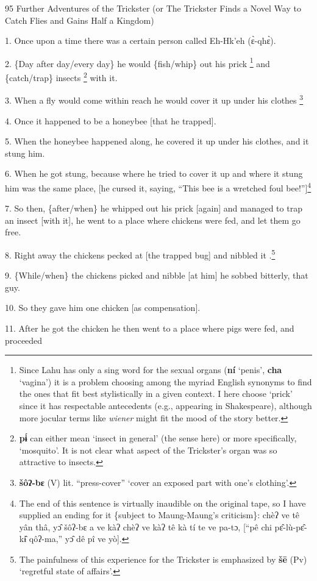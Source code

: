 
95 Further Adventures of the Trickster (or The Trickster Finds a Novel Way to Catch
Flies and Gains Half a Kingdom)

1. Once upon a time there was a certain person called Eh-Hk'eh (ɛ̀-qhɛ̀).

2. \{Day after day/every day\} he would \{fish/whip\} out his prick \footnote{Since Lahu has only a sing word for the sexual organs (\textbf{ní }`penis', \textbf{cha} `vagina') it is a problem choosing among the myriad English synonyms to find the ones that fit best stylistically in a given context. I here choose `prick' since it has respectable antecedents (e.g., appearing in Shakespeare), although more jocular terms like \textit{wiener} might fit the mood of the story better.} and \{catch/trap\}
insects \footnote{\textbf{pɨ́ }can either mean `insect in general' (the sense here) or more specifically, `mosquito'. It is not clear what aspect of the Trickster's organ was so attractive to insects.} with it.

3. When a fly would come within reach he would cover it up under his clothes \footnote{\textbf{šôʔ-bɛ} (V) lit. ``press-cover'' `cover an exposed part with one's clothing'.}

4. Once it happened to be a honeybee [that he trapped].

5. When the honeybee happened along, he covered it up under his clothes, and it
stung him.

6. When he got stung, because where he tried to cover it up and where it stung
him was the same place, [he cursed it, saying, ``This bee is a wretched foul bee!'']\footnote{The end of this sentence is virtually inaudible on the original tape, so I have supplied an ending for it \{subject to Maung-Maung's criticism\}: chèʔ ve tê yân thâ, yɔ̂ šôʔ-bɛ a ve kàʔ chèʔ ve kàʔ tê kà tí te ve pa-tɔ, [``pê chi pɛ̂-lù-pɛ̂-kɨ̂ qôʔ-ma,'' yɔ̂ dê pî ve yò].}

7. So then, \{after/when\} he whipped out his prick [again] and managed to trap
an insect [with it], he went to a place where chickens were fed, and let them go
free.

8. Right away the chickens pecked at [the trapped bug] and nibbled it .\footnote{The painfulness of this experience for the Trickster is emphasized by \textbf{šē} (Pv) `regretful state of affairs'.}

9. \{While/when\} the chickens picked and nibble [at him] he sobbed bitterly, that
guy.

10. So they gave him one chicken [as compensation].

11. After he got the chicken he then went to a place where pigs were fed, and proceeded
